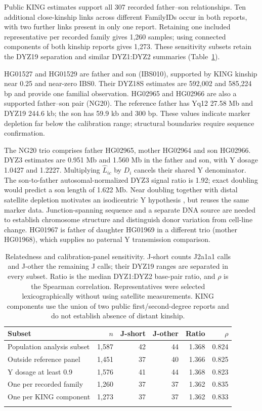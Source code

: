 \documentclass[pdflatex,sn-nature]{sn-jnl}
\begin{document}
Public KING estimates support all 307 recorded father--son relationships. Ten additional close-kinship links across different FamilyIDs occur in both reports, with two further links present in only one report. Retaining one included representative per recorded family gives 1,260 samples; using connected components of both kinship reports gives 1,273. These sensitivity subsets retain the DYZ19 separation and similar DYZ1:DYZ2 summaries (Table~\ref{tab:relatedness}).

HG01527 and HG01529 are father and son (IBS010), supported by KING kinship near 0.25 and near-zero IBS0. Their DYZ18S estimates are 592,002 and 585,224 bp and provide one familial observation. HG02965 and HG02966 are also a supported father--son pair (NG20). The reference father has Yq12 27.58 Mb and DYZ19 244.6 kb; the son has 59.9 kb and 300 bp. These values indicate marker depletion far below the calibration range; structural boundaries require sequence confirmation.

The NG20 trio comprises father HG02965, mother HG02964 and son HG02966. DYZ3 estimates are 0.951 Mb and 1.560 Mb in the father and son, with Y dosage 1.0427 and 1.2227. Multiplying $\widehat L_{ic}$ by $D_i$ cancels their shared Y denominator. The son-to-father autosomal-normalized DYZ3 signal ratio is 1.92; exact doubling would predict a son length of 1.622 Mb. Near doubling together with distal satellite depletion motivates an isodicentric Y hypothesis \cite{Lange2009}, but reuses the same marker data. Junction-spanning sequence and a separate DNA source are needed to establish chromosome structure and distinguish donor variation from cell-line change. HG01967 is father of daughter HG01969 in a different trio (mother HG01968), which supplies no paternal Y transmission comparison.

\begin{table}[tbp]
\caption{Relatedness and calibration-panel sensitivity. J-short counts J2a1a1 calls and J-other the remaining J calls; their DYZ19 ranges are separated in every subset. Ratio is the median DYZ1:DYZ2 base-pair ratio, and $\rho$ is the Spearman correlation. Representatives were selected lexicographically without using satellite measurements. KING components use the union of two public first/second-degree reports and do not establish absence of distant kinship.}\label{tab:relatedness}
\centering
\small
\begin{tabular}{lrrrrr}
\toprule
Subset & $n$ & J-short & J-other & Ratio & $\rho$ \\
\midrule
Population analysis subset & 1,587 & 42 & 44 & 1.368 & 0.824 \\
Outside reference panel & 1,451 & 37 & 40 & 1.366 & 0.825 \\
Y dosage at least 0.9 & 1,576 & 41 & 44 & 1.368 & 0.823 \\
One per recorded family & 1,260 & 37 & 37 & 1.362 & 0.835 \\
One per KING component & 1,273 & 37 & 37 & 1.362 & 0.833 \\
\botrule
\end{tabular}
\end{table}
\end{document}
